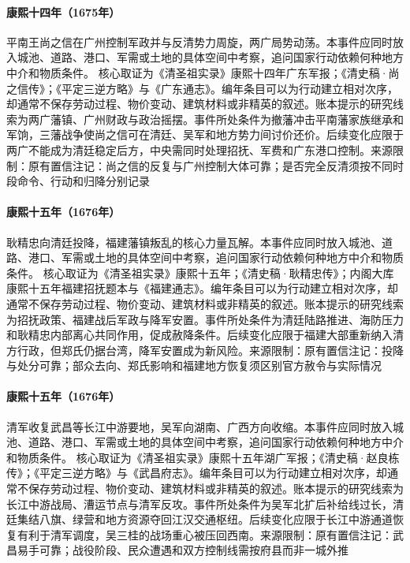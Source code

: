 \hypertarget{civic:EQ-1675-SHANG-ZHIXIN}{}\paragraph{康熙十四年（1675年）}平南王尚之信在广州控制军政并与反清势力周旋，两广局势动荡。本事件应同时放入城池、道路、港口、军需或土地的具体空间中考察，追问国家行动依赖何种地方中介和物质条件。 核心取证为《清圣祖实录》康熙十四年广东军报；《清史稿·尚之信传》；《平定三逆方略》与《广东通志》。编年条目可以为行动建立相对次序，却通常不保存劳动过程、物价变动、建筑材料或非精英的叙述。账本提示的研究线索为两广藩镇、广州财政与政治摇摆。事件所处条件为撤藩冲击平南藩家族继承和军饷，三藩战争使尚之信可在清廷、吴军和地方势力间讨价还价。后续变化应限于两广不能成为清廷稳定后方，中央需同时处理招抚、军费和广东港口控制。来源限制：原有置信注记：尚之信的反复与广州控制大体可靠；是否完全反清须按不同时段命令、行动和归降分别记录
\hypertarget{civic:EQ-1676-GENG-SURRENDER}{}\paragraph{康熙十五年（1676年）}耿精忠向清廷投降，福建藩镇叛乱的核心力量瓦解。本事件应同时放入城池、道路、港口、军需或土地的具体空间中考察，追问国家行动依赖何种地方中介和物质条件。 核心取证为《清圣祖实录》康熙十五年；《清史稿·耿精忠传》；内阁大库康熙十五年福建招抚题本与《福建通志》。编年条目可以为行动建立相对次序，却通常不保存劳动过程、物价变动、建筑材料或非精英的叙述。账本提示的研究线索为招抚政策、福建战后军政与降军安置。事件所处条件为清廷陆路推进、海防压力和耿精忠内部离心共同作用，促成赦降条件。后续变化应限于福建大部重新纳入清方行政，但郑氏仍据台湾，降军安置成为新风险。来源限制：原有置信注记：投降与处分可靠；部众去向、郑氏影响和福建地方恢复须区别官方赦令与实际情况
\hypertarget{civic:EQ-1676-WUCHANG}{}\paragraph{康熙十五年（1676年）}清军收复武昌等长江中游要地，吴军向湖南、广西方向收缩。本事件应同时放入城池、道路、港口、军需或土地的具体空间中考察，追问国家行动依赖何种地方中介和物质条件。 核心取证为《清圣祖实录》康熙十五年湖广军报；《清史稿·赵良栋传》；《平定三逆方略》与《武昌府志》。编年条目可以为行动建立相对次序，却通常不保存劳动过程、物价变动、建筑材料或非精英的叙述。账本提示的研究线索为长江中游战局、漕运节点与清军反攻。事件所处条件为吴军北扩后补给线过长，清廷集结八旗、绿营和地方资源夺回江汉交通枢纽。后续变化应限于长江中游通道恢复有利于清军调度，吴三桂的战场重心被压回西南。来源限制：原有置信注记：武昌易手可靠；战役阶段、民众遭遇和双方控制线需按府县而非一城外推
